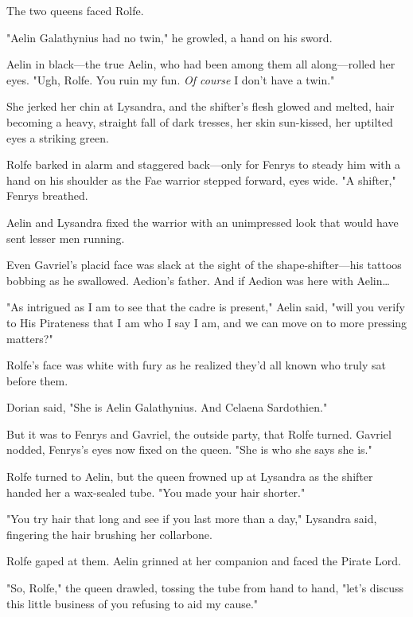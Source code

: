 The two queens faced Rolfe.

"Aelin Galathynius had no twin," he growled, a hand on his sword.

Aelin in black---the true Aelin, who had been among them all along---rolled her eyes. "Ugh, Rolfe. You ruin my fun. \emph{Of course}
I don't have a twin."

She jerked her chin at Lysandra, and the shifter's flesh glowed and melted, hair becoming a heavy, straight fall of dark tresses, her skin sun-kissed, her uptilted eyes a striking green.

Rolfe barked in alarm and staggered back---only for Fenrys to steady him with a hand on his shoulder as the Fae warrior stepped forward, eyes wide. "A shifter," Fenrys breathed.

Aelin and Lysandra fixed the warrior with an unimpressed look that would have sent lesser men running.

Even Gavriel's placid face was slack at the sight of the shape-shifter---his tattoos bobbing as he swallowed. Aedion's father. And if Aedion was here with Aelin\ldots{}

"As intrigued as I am to see that the cadre is present," Aelin said, "will you verify to His Pirateness that I am who I say I am, and we can move on to more pressing matters?"

Rolfe's face was white with fury as he realized they'd all known who truly sat before them.

Dorian said, "She is Aelin Galathynius. And Celaena Sardothien."

But it was to Fenrys and Gavriel, the outside party, that Rolfe turned. Gavriel nodded, Fenrys's eyes now fixed on the queen. "She is who she says she is."

Rolfe turned to Aelin, but the queen frowned up at Lysandra as the shifter handed her a wax-sealed tube. "You made your hair shorter."

"You try hair that long and see if you last more than a day," Lysandra said, fingering the hair brushing her collarbone.

Rolfe gaped at them. Aelin grinned at her companion and faced the Pirate Lord.

"So, Rolfe," the queen drawled, tossing the tube from hand to hand, "let's discuss this little business of you refusing to aid my cause."
